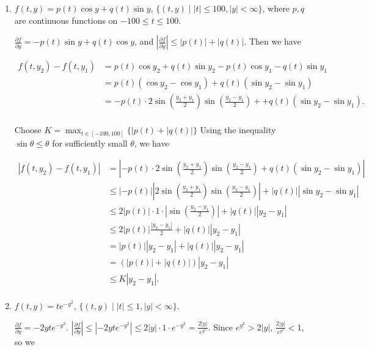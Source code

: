 \documentclass[11pt,oneside,english]{amsart}
\theoremstyle{definition}
\newcommand{\pp}[2]{\frac{\partial{#1}}{\partial{#2}}}
\begin{document}
\begin{enumerate}
\begin{enumerate}
\vspace{-10mm}
\item $f(t,y)=p(t)\cos y+q(t)\sin y$, $\{(t,y)\mid |t|\leq 100, |y|<\infty\}$, where $p,q$ are continuous functions on $-100\leq t\leq 100$.

$\displaystyle \pp{f}{y}=-p(t)\sin y+q(t)\cos y$, and $\displaystyle\left|\pp{f}{y}\right|\leq|p(t)|+|q(t)|$. Then we have

\begin{align*}
f(t,y_2)-f(t,y_1)&=p(t)\cos y_2+q(t)\sin y_2-p(t)\cos y_1-q(t)\sin y_1\\[2mm]
&=p(t)(\cos y_2-\cos y_1)+q(t)(\sin y_2-\sin y_1)\\[2mm]
&=-p(t)\cdot2\sin\left(\frac{y_2+y_1}{2}\right)\sin\left(\frac{y_2-y_1}{2}\right)++q(t)(\sin y_2-\sin y_1).\\[2mm]
\end{align*}

\vspace{-10mm}
Choose $\displaystyle K=\max_{t\in[-100,100]}\{|p(t)+|q(t)|\}$ Using the inequality $\sin\theta\leq\theta$ for sufficiently small $\theta$, we have

\vspace{-5mm}
\begin{align*}
|f(t,y_2)-f(t,y_1)|&=\left|-p(t)\cdot2\sin\left(\frac{y_2+y_1}{2}\right)\sin\left(\frac{y_2-y_1}{2}\right)+q(t)(\sin y_2-\sin y_1)\right|\\[2mm]
&\leq|-p(t)|\left|2\sin\left(\frac{y_2+y_1}{2}\right)\sin\left(\frac{y_2-y_1}{2}\right)\right|+|q(t)|\left|\sin y_2-\sin y_1\right|\\[2mm]
&\leq2|p(t)|\cdot1\cdot\left|\sin\left(\frac{y_2-y_1}{2}\right)\right|+|q(t)||y_2-y_1|\\[2mm]
&\leq2|p(t)|\frac{|y_2-y_1|}{2}+|q(t)||y_2-y_1|\\[2mm]
&=|p(t)||y_2-y_1|+|q(t)||y_2-y_1|\\[2mm]
&=\left(|p(t)|+|q(t)|\right)|y_2-y_1|\\[2mm]
&\leq K|y_2-y_1|.\\[2mm]
\end{align*}



\item $f(t,y)=te^{-y^2}$, $\{(t,y)\mid |t|\leq 1,|y|<\infty\}$.

$\displaystyle \pp{f}{y}=-2yte^{-y^2}$. $\displaystyle \left|\pp{f}{y}\right|\leq \left|-2yte^{-y^2}\right|\leq2|y|\cdot1\cdot e^{-y^2}=\frac{2|y|}{e^{y^2}}$. Since $e^{y^2}>2|y|$, $\displaystyle \frac{2|y|}{e^{y^2}}< 1$, so we 


\end{enumerate}
\end{enumerate}
\end{document}
